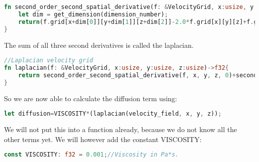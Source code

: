 \documentclass{article}
\begin{document}
\begin{lstlisting}[language=Rust, style=boxed, breaklines=true]
fn second_order_second_spatial_derivative(f: &VelocityGrid, x:usize, y:usize, z:usize, dimension_number:usize) -> f32{
    let dim = get_dimension(dimension_number);
    return(f.grid[x+dim[0]][y+dim[1]][z+dim[2]]-2.0*f.grid[x][y][z]+f.grid[x-dim[0]][y-dim[1]][z-dim[2]])/(GRIDELEMENTSCALE*GRIDELEMENTSCALE);
}
\end{lstlisting}
The sum of all three second derivatives is called the laplacian. \cite{MAC}
\begin{lstlisting}[language=Rust, style=boxed, breaklines=true]
//Laplacian velocity grid
fn laplacian(f: &VelocityGrid, x:usize, y:usize, z:usize)->f32{
    return second_order_second_spatial_derivative(f, x, y, z, 0)+second_order_second_spatial_derivative(f, x, y, z, 1)+second_order_second_spatial_derivative(f, x, y, z, 2);
}
\end{lstlisting}
So we are now able to calculate the diffusion term using:
\begin{lstlisting}[language=Rust, style=boxed, breaklines=true]
let diffusion=VISCOSITY*(laplacian(velocity_field, x, y, z));
\end{lstlisting}
We will not put this into a function already, because we do not know all the other terms yet. We will however add the constant VISCOSITY:
\begin{lstlisting}[language=Rust, style=boxed, breaklines=true]
const VISCOSITY: f32 = 0.001;//Viscosity in Pa*s.
\end{lstlisting}
\end{document}

